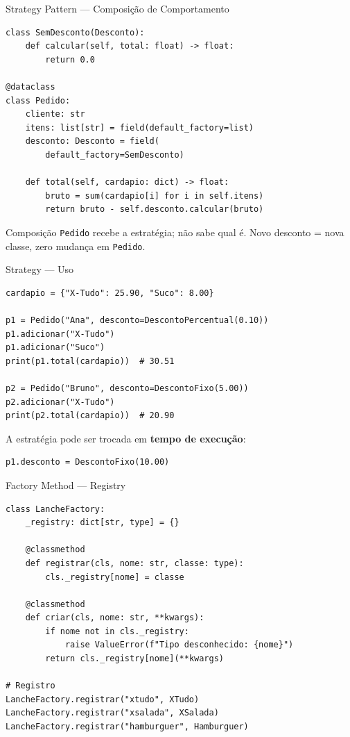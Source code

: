 \documentclass[aspectratio=169]{beamer}
\begin{document}
\begin{frame}[fragile,shrink=15]{Strategy Pattern --- Composição de Comportamento}
\begin{lstlisting}
class SemDesconto(Desconto):
    def calcular(self, total: float) -> float:
        return 0.0

@dataclass
class Pedido:
    cliente: str
    itens: list[str] = field(default_factory=list)
    desconto: Desconto = field(
        default_factory=SemDesconto)

    def total(self, cardapio: dict) -> float:
        bruto = sum(cardapio[i] for i in self.itens)
        return bruto - self.desconto.calcular(bruto)
\end{lstlisting}

\begin{exampleblock}{Composição}
\texttt{Pedido} recebe a estratégia; não sabe qual é. Novo desconto = nova classe, zero mudança em \texttt{Pedido}.
\end{exampleblock}
\end{frame}

\begin{frame}[fragile]{Strategy --- Uso}
\begin{lstlisting}
cardapio = {"X-Tudo": 25.90, "Suco": 8.00}

p1 = Pedido("Ana", desconto=DescontoPercentual(0.10))
p1.adicionar("X-Tudo")
p1.adicionar("Suco")
print(p1.total(cardapio))  # 30.51

p2 = Pedido("Bruno", desconto=DescontoFixo(5.00))
p2.adicionar("X-Tudo")
print(p2.total(cardapio))  # 20.90
\end{lstlisting}

A estratégia pode ser trocada em \textbf{tempo de execução}:
\begin{lstlisting}
p1.desconto = DescontoFixo(10.00)
\end{lstlisting}
\end{frame}

\begin{frame}[fragile,shrink=5]{Factory Method --- Registry}
\begin{lstlisting}
class LancheFactory:
    _registry: dict[str, type] = {}

    @classmethod
    def registrar(cls, nome: str, classe: type):
        cls._registry[nome] = classe

    @classmethod
    def criar(cls, nome: str, **kwargs):
        if nome not in cls._registry:
            raise ValueError(f"Tipo desconhecido: {nome}")
        return cls._registry[nome](**kwargs)

# Registro
LancheFactory.registrar("xtudo", XTudo)
LancheFactory.registrar("xsalada", XSalada)
LancheFactory.registrar("hamburguer", Hamburguer)
\end{lstlisting}
\end{frame}
\end{document}
